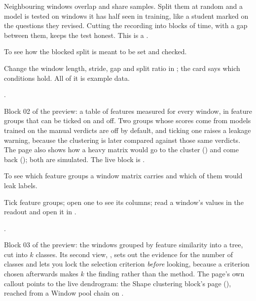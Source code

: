\begin{plainterms}
Neighbouring windows overlap and share samples. Split them at random and a model is tested on
windows it has half seen in training, like a student marked on the questions they revised. Cutting
the recording into blocks of time, with a gap between them, keeps the test honest. This is a
.
\end{plainterms}


To see how the blocked split is meant to be set and checked.

Change the window length, stride, gap and split ratio in ; the  card says
which conditions hold. All of it is example data.

.

Block 02 of the preview: a table of features measured for every window, in feature groups that
can be ticked on and off. Two groups whose scores come from models trained on the manual verdicts
are off by default, and ticking one raises a leakage warning, because the clustering is later
compared against those same verdicts. The page also shows how a heavy matrix would go to the
cluster () and come back (); both are simulated. The live
block is .


To see which feature groups a window matrix carries and which of them would leak labels.

Tick feature groups; open one to see its columns; read a window's values in the readout and open
it in .

.

Block 03 of the preview: the windows grouped by feature similarity into a tree, cut into \(k\)
classes. Its second view, , sets out the evidence for the number of classes and lets
you lock the selection criterion \emph{before} looking, because a criterion chosen afterwards makes
\(k\) the finding rather than the method. The page's own callout points to the live dendrogram:
the Shape clustering block's page (), reached from a Window pool
chain on .

